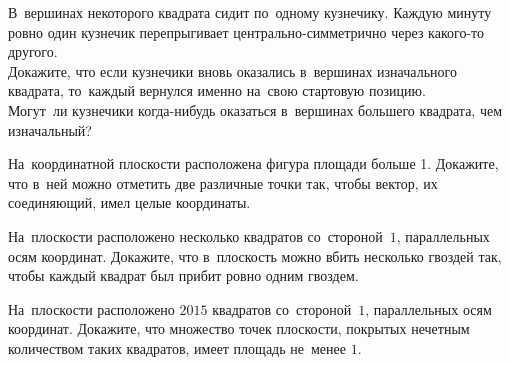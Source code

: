 


\begin{problems}

\item
В~вершинах некоторого квадрата сидит по~одному кузнечику.
Каждую минуту ровно один кузнечик перепрыгивает центрально-симметрично через
какого-то другого.
\\
\subproblem
Докажите, что если кузнечики вновь оказались в~вершинах изначального квадрата,
то~каждый вернулся именно на~свою стартовую позицию.
\\
\subproblem
Могут~ли кузнечики когда-нибудь оказаться в~вершинах большего квадрата, чем
изначальный?



\item
На~координатной плоскости расположена фигура площади больше 1.
Докажите, что в~ней можно отметить две различные точки так, чтобы вектор, их
соединяющий, имел целые координаты.

\item
На~плоскости расположено несколько квадратов со~стороной~$1$, параллельных осям
координат.
Докажите, что в~плоскость можно вбить несколько гвоздей так, чтобы каждый
квадрат был прибит ровно одним гвоздем.


\item
На~плоскости расположено $2015$ квадратов со~стороной~$1$, параллельных осям
координат.
Докажите, что множество точек плоскости, покрытых нечетным количеством таких
квадратов, имеет площадь не~менее $1$.


\end{problems}
